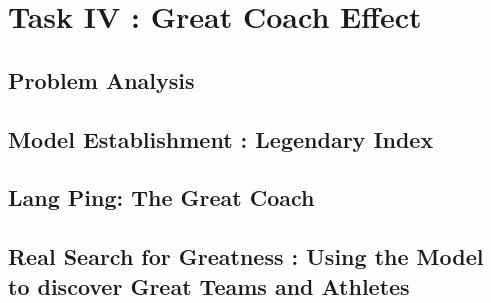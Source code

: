 \section{Task IV : Great Coach Effect}

\subsection{Problem Analysis}

\subsection{Model Establishment : Legendary Index}

\subsection{Lang Ping: The Great Coach}

\subsection{Real Search for Greatness : Using the Model to discover Great Teams and Athletes}